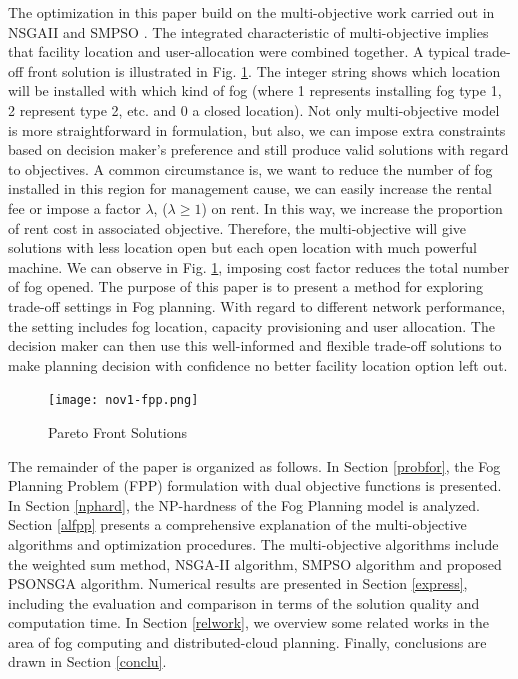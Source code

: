 \documentclass[10pt,journal,compsoc]{IEEEtran}
\begin{document}
The optimization in this paper build on the multi-objective work carried out in NSGAII\cite{Deb:2002:FEM:2221359.2221582} and SMPSO \cite{smpso}. The integrated characteristic of multi-objective implies that facility location and user-allocation were combined together. A typical trade-off front solution is illustrated in Fig. \ref{tradeofffront}. The integer string shows which location will be installed with which kind of fog (where 1 represents installing fog type 1, 2 represent type 2, etc. and 0 a closed location). Not only multi-objective model is more straightforward in formulation, but also, we can impose extra constraints based on decision maker's preference and still produce valid solutions with regard to objectives. A common circumstance is, we want to reduce the number of fog installed in this region for management cause, we can easily increase the rental fee or impose a factor $\lambda$, ($ \lambda \geq 1$) on rent. In this way, we increase the proportion of rent cost in associated objective. Therefore, the multi-objective will give solutions with less location open but each open location with much powerful machine. We can observe in Fig. \ref{tradeofffront}, imposing cost factor reduces the total number of fog opened. 
The purpose of this paper is to present a method for exploring trade-off settings in Fog planning. With regard to different network performance, the setting includes fog location, capacity provisioning and user allocation. The decision maker can then use this well-informed and flexible trade-off solutions to make planning decision with confidence no better facility location option left out.

\begin{figure}[ht]
\centerline{\texttt{[image: nov1-fpp.png]}}
\caption{Pareto Front Solutions} 
\label{tradeofffront}
\end{figure}
\fi

The remainder of the paper is organized as follows. In Section \ref{probfor}, the Fog Planning Problem (FPP) formulation with dual objective functions is presented. In Section \ref{nphard}, the NP-hardness of the Fog Planning model is analyzed. Section \ref{alfpp} presents a comprehensive explanation of the multi-objective algorithms and optimization procedures. The multi-objective algorithms include the weighted sum method, NSGA-II algorithm, SMPSO algorithm and proposed PSONSGA algorithm. Numerical results are presented in Section \ref{express}, including the evaluation and comparison in terms of the solution quality and computation time. In Section \ref{relwork}, we overview some related works in the area of fog computing and distributed-cloud planning. Finally, conclusions are drawn in Section \ref{conclu}.
\end{document}
